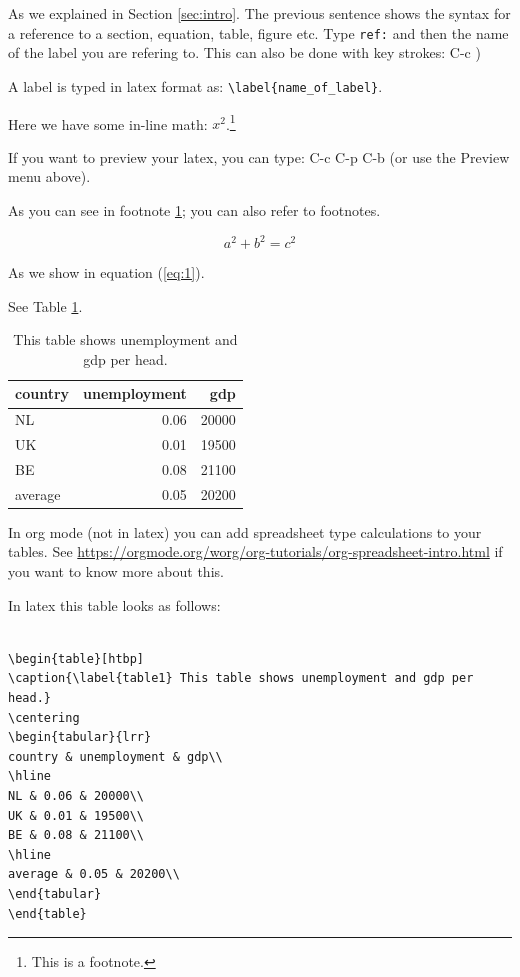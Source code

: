 \documentclass[11pt]{article}
\begin{document}
As we explained in Section \ref{sec:intro}. The previous sentence shows the syntax for a reference to a section, equation, table, figure etc. Type \texttt{ref:} and then the name of the label you are refering to. This can also be done with key strokes: C-c )

A label is typed in latex format as: \texttt{\textbackslash{}label\{name\_of\_label\}}. 

Here we have some in-line math: \(x^2\).\footnote{\label{fn:footnote} This is a footnote.}

If you want to preview your latex, you can type: C-c C-p C-b (or use the Preview menu above).


As you can see in footnote \ref{fn:footnote}; you can also refer to footnotes.


\begin{equation}
\label{eq:1}
a^2 + b^2 = c^2
\end{equation}

As we show in equation (\ref{eq:1}).

See Table \ref{table1}.

\begin{table}[htbp]
\caption{\label{table1} This table shows unemployment and gdp per head.}
\centering
\begin{tabular}{lrr}
country & unemployment & gdp\\
\hline
NL & 0.06 & 20000\\
UK & 0.01 & 19500\\
BE & 0.08 & 21100\\
\hline
average & 0.05 & 20200\\
\end{tabular}
\end{table}

In org mode (not in latex) you can add spreadsheet type calculations to your tables. See \url{https://orgmode.org/worg/org-tutorials/org-spreadsheet-intro.html} if you want to know more about this.

In latex this table looks as follows:

\begin{verbatim}

\begin{table}[htbp]
\caption{\label{table1} This table shows unemployment and gdp per head.}
\centering
\begin{tabular}{lrr}
country & unemployment & gdp\\
\hline
NL & 0.06 & 20000\\
UK & 0.01 & 19500\\
BE & 0.08 & 21100\\
\hline
average & 0.05 & 20200\\
\end{tabular}
\end{table}

\end{verbatim}
\end{document}
